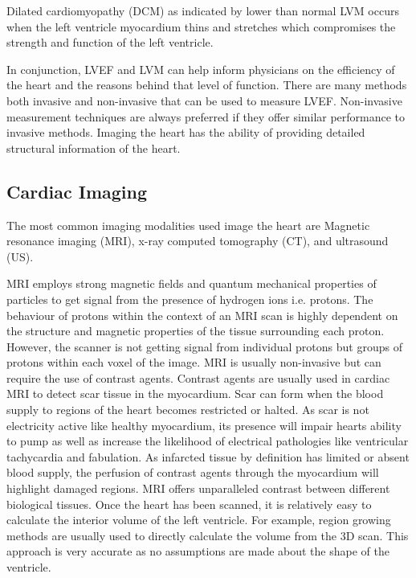\documentclass[12pt]{article}
\begin{document}
Dilated cardiomyopathy (DCM) as indicated by lower than normal LVM occurs when the left ventricle myocardium thins and stretches which compromises the strength and function of the left ventricle. 

In conjunction, LVEF and LVM can help inform physicians on the efficiency of the heart and the reasons behind that level of function.
There are many methods both invasive and non-invasive that can be used to measure LVEF.
Non-invasive measurement techniques are always preferred if they offer similar performance to invasive methods.
Imaging the heart has the ability of providing detailed structural information of the heart.

\subsection{Cardiac Imaging}

The most common imaging modalities used image the heart are Magnetic resonance imaging (MRI), x-ray computed tomography (CT), and ultrasound (US).

MRI employs strong magnetic fields and quantum mechanical properties of particles to get signal from the presence of hydrogen ions i.e. protons.
The behaviour of protons within the context of an MRI scan is highly dependent on the structure and magnetic properties of the tissue surrounding each proton.
However, the scanner is not getting signal from individual protons but groups of protons within each voxel of the image.
MRI is usually non-invasive but can require the use of contrast agents.
Contrast agents are usually used in cardiac MRI to detect scar tissue in the myocardium.
Scar can form when the blood supply to regions of the heart becomes restricted or halted.
As scar is not electricity active like healthy myocardium, its presence will impair hearts ability to pump as well as increase the likelihood of electrical pathologies like ventricular tachycardia and fabulation.
As infarcted tissue by definition has limited or absent blood supply, the perfusion of contrast agents through the myocardium will highlight damaged regions.
MRI offers unparalleled contrast between different biological tissues.
Once the heart has been scanned, it is relatively easy to calculate the interior volume of the left ventricle.
For example, region growing methods are usually used  to directly calculate the volume from the 3D scan.
This approach is very accurate as no assumptions are made about the shape of the ventricle.
\end{document}
